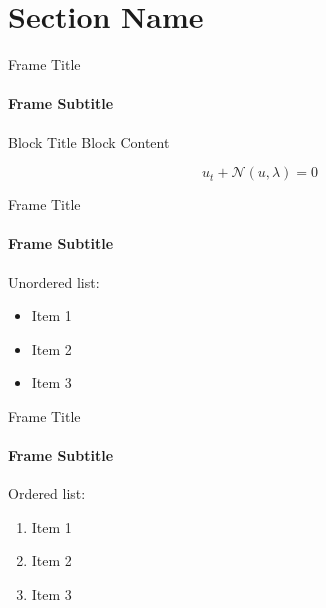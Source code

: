 
\section{Section Name}

\begin{frame}{Frame Title}
\framesubtitle{Frame Subtitle} 
    \begin{block}{Block Title}
        Block Content

        \begin{equation}
            u_t + \mathcal{N}(u, \lambda) = 0
        \end{equation}
    \end{block}
\end{frame}

\begin{frame}{Frame Title}
\framesubtitle{Frame Subtitle} 

Unordered list:

\begin{itemize}
    \item Item 1
    \item Item 2
    \item Item 3
\end{itemize}
\end{frame}

\begin{frame}{Frame Title}
\framesubtitle{Frame Subtitle} 

Ordered list:

\begin{enumerate}
    \item Item 1
    \item Item 2
    \item Item 3
\end{enumerate}

\end{frame}
